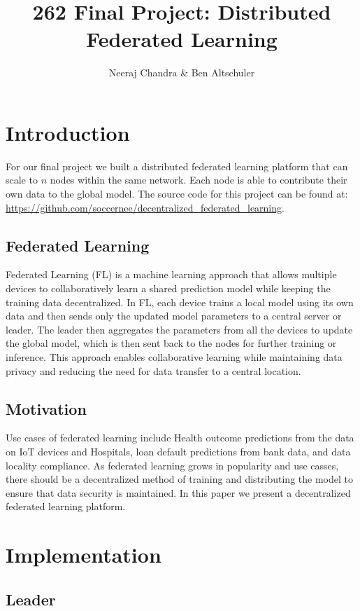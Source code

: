 \documentclass{article}
\title{262 Final Project: Distributed Federated Learning}
\author{Neeraj Chandra & Ben Altschuler}
\begin{document}
\maketitle


\section{Introduction}

For our final project we built a distributed federated learning platform that can scale to $n$ nodes within the same network. Each node is able to contribute their own data to the global model. The source code for this project can be found at: \url{https://github.com/soccernee/decentralized_federated_learning}.
  

\subsection{Federated Learning}
Federated Learning (FL) is a machine learning approach that allows multiple devices to collaboratively learn a shared prediction model while keeping the training data decentralized. In FL, each device trains a local model using its own data and then sends only the updated model parameters to a central server or leader. The leader then aggregates the parameters from all the devices to update the global model, which is then sent back to the nodes for further training or inference. This approach enables collaborative learning while maintaining data privacy and reducing the need for data transfer to a central location.

\subsection{Motivation}
Use cases of federated learning include Health outcome predictions from the data on IoT devices and Hospitals, loan default predictions from bank data, and data locality compliance. As federated learning grows in popularity and use casses, there should be a decentralized method of training and distributing the model to ensure that data security is maintained. In this paper we present a decentralized federated learning platform.    

\section{Implementation}

\subsection{Leader}
\end{document}
